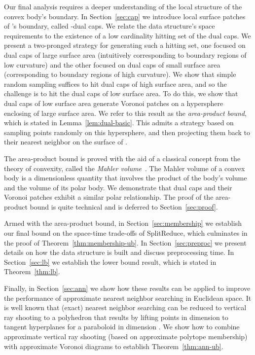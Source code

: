 \documentclass[11pt]{article}   \usepackage[letterpaper,hmargin=2.1cm,vmargin=3cm]{geometry}
\newcommand{\alg}{\textrm{SplitReduce}}
\begin{document}
Our final analysis requires a deeper understanding of the local structure of the convex body's boundary. In Section~\ref{sec:cap} we introduce local surface patches of 's boundary, called -dual caps. We relate the data structure's space requirements to the existence of a low cardinality hitting set of the dual caps. We present a two-pronged strategy for generating such a hitting set, one focused on dual caps of large surface area (intuitively corresponding to boundary regions of low curvature) and the other focused on dual caps of small surface area (corresponding to boundary regions of high curvature). We show that simple random sampling suffices to hit dual caps of high surface area, and so the challenge is to hit the dual caps of low surface area. To do this, we show that dual caps of low surface area generate Voronoi patches on a hypersphere enclosing  of large surface area. We refer to this result as the \emph{area-product bound}, which is stated in Lemma~\ref{lem:dual-basic}. This admits a strategy based on sampling points randomly on this hypersphere, and then projecting them back to their nearest neighbor on the surface of . 

The area-product bound is proved with the aid of a classical concept from the theory of convexity, called the \emph{Mahler volume}~\cite{BoMi,Santalo}. The Mahler volume of a convex body is a dimensionless quantity that involves the product of the body's volume and the volume of its polar body. We demonstrate that dual caps and their Voronoi patches exhibit a similar polar relationship. The proof of the area-product bound is quite technical and is deferred to Section~\ref{sec:proof}. 

Armed with the area-product bound, in Section~\ref{sec:membership} we establish our final bound on the space-time trade-offs of {\alg}, which culminates in the proof of Theorem~\ref{thm:membership-ub}. In Section~\ref{sec:preproc} we present details on how the data structure is built and discuss preprocessing time. In Section~\ref{sec:lb} we establish the lower bound result, which is stated in Theorem~\ref{thm:lb}. 

Finally, in Section~\ref{sec:ann} we show how these results can be applied to improve the performance of approximate nearest neighbor searching in Euclidean space. It is well known that (exact) nearest neighbor searching can be reduced to vertical ray shooting to a polyhedron that results by lifting points in dimension  to tangent hyperplanes for a paraboloid in dimension  \cite{ray-shooting-NN,edels}. We show how to combine approximate vertical ray shooting (based on approximate polytope membership) with approximate Voronoi diagrams to establish Theorem~\ref{thm:ann-ub}.
\end{document}
